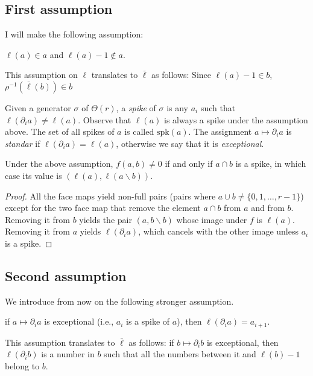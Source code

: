 	\subsection{First assumption} I will make the following assumption:
	\begin{assumption} $\ell(a)\in a$ and $\ell(a)-1\notin a$.
	\end{assumption}
	\begin{remark} This assumption on $\ell$ translates to $\bar{\ell}$ as follows: Since $\ell(a)-1\in b$, $\rho^{-1}(\bar{\ell}(b))\in b$
	\end{remark}
	\begin{definition} Given a generator $\sigma$ of $\Theta(r)$, a \emph{spike} of $\sigma$ is any $a_i$ such that $\ell(\partial_i a) \neq \ell(a)$. Observe that $\ell(a)$ is always a spike under the assumption above. The set of all spikes of $a$ is called $\mathrm{spk}(a)$. The assignment $a\mapsto \partial_i a$ is \emph{standar} if $\ell(\partial_i a) = \ell(a)$, otherwise we say that it is \emph{exceptional}.
	\end{definition}
	\begin{lemma} Under the above assumption, $f(a,b) \neq 0$ if and only if $a\cap b$ is a spike, in which case its value is $(\ell(a),\ell(a\smallsetminus b))$.
	\end{lemma}
	\begin{proof} All the face maps yield non-full pairs (pairs where $a\cup b \neq \{0,1,\ldots,r-1\}$) except for the two face map that remove the element $a\cap b$ from $a$ and from $b$. Removing it from $b$ yields the pair $(a,b\smallsetminus b)$ whose image under $f$ is $\ell(a)$. Removing it from $a$ yields $\ell(\partial_i a)$, which cancels with the other image unless $a_i$ is a spike.
	\end{proof}
	\subsection{Second assumption}We introduce from now on the following stronger assumption.
	\begin{assumption} if $a\mapsto \partial_ia$ is exceptional (i.e., $a_i$ is a spike of $a$), then $\ell(\partial_i a) = a_{i+1}$.
	\end{assumption}
	\begin{remark} This assumption translates to $\bar{\ell}$ as follows: if $b\mapsto \partial_i b$ is exceptional, then $\ell(\partial_ib)$ is a number in $b$ such that all the numbers between it and $\ell(b)-1$ belong to $b$.
	\end{remark}


